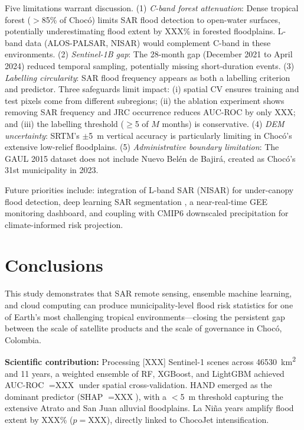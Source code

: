\documentclass{article}
\begin{document}
Five limitations warrant discussion. (1) \textit{C-band forest attenuation}: Dense tropical forest ($>$85\% of Choc\'o) limits SAR flood detection to open-water surfaces, potentially underestimating flood extent by XXX\% in forested floodplains. L-band data (ALOS-PALSAR, NISAR) would complement C-band in these environments. (2) \textit{Sentinel-1B gap}: The 28-month gap (December 2021 to April 2024) reduced temporal sampling, potentially missing short-duration events. (3) \textit{Labelling circularity}: SAR flood frequency appears as both a labelling criterion and predictor. Three safeguards limit impact: (i) spatial CV ensures training and test pixels come from different subregions; (ii) the ablation experiment shows removing SAR frequency and JRC occurrence reduces AUC-ROC by only XXX; and (iii) the labelling threshold ($\geq$5 of $M$ months) is conservative. (4) \textit{DEM uncertainty}: SRTM's $\pm$\SI{5}{\metre} vertical accuracy is particularly limiting in Choc\'o's extensive low-relief floodplains. (5) \textit{Administrative boundary limitation}: The GAUL 2015 dataset does not include Nuevo Bel\'en de Bajir\'a, created as Choc\'o's 31st municipality in 2023.

Future priorities include: integration of L-band SAR (NISAR) for under-canopy flood detection, deep learning SAR segmentation \citep{Bonafilia2020}, a near-real-time GEE monitoring dashboard, and coupling with CMIP6 downscaled precipitation for climate-informed risk projection.

\section{Conclusions}
\label{sec:conclusions}

This study demonstrates that SAR remote sensing, ensemble machine learning, and cloud computing can produce municipality-level flood risk statistics for one of Earth's most challenging tropical environments---closing the persistent gap between the scale of satellite products and the scale of governance in Choc\'o, Colombia.

\textbf{Scientific contribution:} Processing [XXX] Sentinel-1 scenes across \SI{46530}{\kilo\metre\squared} and 11 years, a weighted ensemble of RF, XGBoost, and LightGBM achieved AUC-ROC $= \text{XXX}$ under spatial cross-validation. HAND emerged as the dominant predictor (SHAP $= \text{XXX}$), with a $<$\SI{5}{\metre} threshold capturing the extensive Atrato and San Juan alluvial floodplains. La Ni\~na years amplify flood extent by XXX\% ($p = \text{XXX}$), directly linked to ChocoJet intensification.
\end{document}

